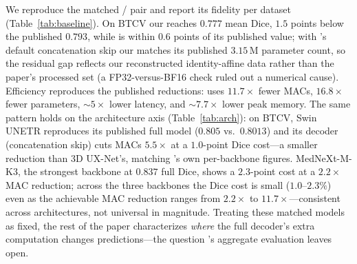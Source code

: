 We reproduce the matched \fullmodel{}/\effimodel{} pair and report its fidelity per
dataset (Table~\ref{tab:baseline}).  On BTCV our \effimodel{} reaches $0.777$ mean
Dice, $1.5$ points below the published $0.793$, while \fullmodel{} is within $0.6$
points of its published value; with \method{}'s default concatenation skip our
\effimodel{} matches its published $3.15$\,M parameter count, so the residual gap
reflects our reconstructed identity-affine data rather than the paper's processed set
(a FP32-versus-BF16 check ruled out a numerical cause).  Efficiency reproduces the
published reductions: \effimodel{} uses $11.7\times$ fewer MACs, $16.8\times$ fewer
parameters, $\sim\!5\times$ lower latency, and $\sim\!7.7\times$ lower peak memory.
The same pattern holds on the architecture axis (Table~\ref{tab:arch}): on BTCV,
Swin UNETR reproduces its published full model ($0.805$ vs.\ $0.8013$) and its
\method{} decoder (concatenation skip) cuts MACs $5.5\times$ at a $1.0$-point Dice
cost---a smaller reduction than 3D UX-Net's, matching \method{}'s own per-backbone
figures. MedNeXt-M-K3, the strongest backbone at $0.837$ full Dice, shows a
$2.3$-point cost at a $2.2\times$ MAC reduction; across the three backbones the Dice cost is small
($1.0$--$2.3\%$) even as the achievable MAC reduction ranges from $2.2\times$ to
$11.7\times$---consistent across architectures, not universal in magnitude.
Treating these matched models as fixed, the rest of the paper characterizes
\emph{where} the full decoder's extra computation changes predictions---the question
\method{}'s aggregate evaluation leaves open.

\begin{table}[t]
\centering
\caption{Architecture axis (BTCV): reproduction and efficiency of the matched
full/\method{} pair per backbone. Dice is Full$\rightarrow$\method{}; reductions are
Full$/$\method{}.}
\label{tab:arch}
\setlength{\tabcolsep}{4pt}
\end{table}

